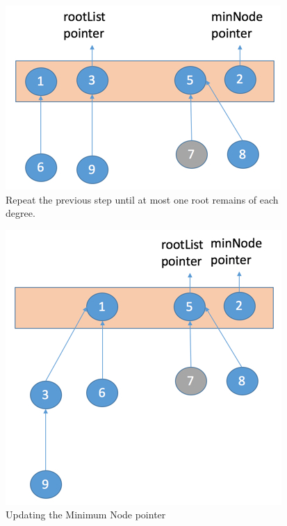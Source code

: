 \begin{figure}[h]
	\includegraphics[width=0.95\columnwidth]{Figures/FibonacciHeapStep3ExtractMinOperation}
	\caption{Repeat the previous step until at most one root remains of each degree.}
	\label {fig:extractMin3}
\end{figure}
\begin{figure}[h]
	\includegraphics[width=0.95\columnwidth]{Figures/FibonacciHeapStep4ExtractMinOperation}
	\caption{Updating the Minimum Node pointer}
	\label {fig:extractMin4}
\end{figure}





